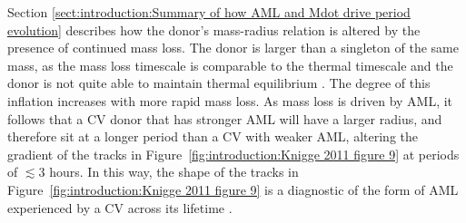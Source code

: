 Section \ref{sect:introduction:Summary of how AML and Mdot drive period evolution} describes how the donor's mass-radius relation is altered by the presence of continued mass loss. The donor is larger than a singleton of the same mass, as the mass loss timescale is comparable to the thermal timescale and the donor is not quite able to maintain thermal equilibrium \citep{knigge11}. The degree of this inflation increases with more rapid mass loss. As mass loss is driven by AML, it follows that a CV donor that has stronger AML will have a larger radius, and therefore sit at a longer period than a CV with weaker AML, altering the gradient of the tracks in Figure~\ref{fig:introduction:Knigge 2011 figure 9} at periods of $\lesssim 3$ hours. In this way, the shape of the tracks in Figure~\ref{fig:introduction:Knigge 2011 figure 9} is a diagnostic of the form of AML experienced by a CV across its lifetime \citep{knigge11}.

